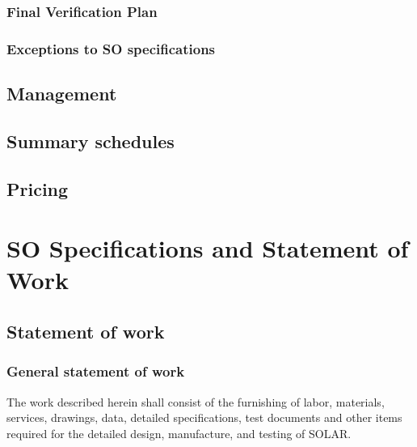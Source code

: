 \documentclass[12pt,letter]{article}
\begin{document}
    \subsubsection{Final Verification Plan}
    \subsubsection{Exceptions to SO specifications}
\subsection{Management}
\subsection{Summary schedules}
\subsection{Pricing}

\section{SO Specifications and Statement of Work}
\subsection{Statement of work}
	\subsubsection{General statement of work}
    The work described herein shall consist of the furnishing of labor, materials, services, drawings, data, detailed specifications, test documents and other items required for the detailed design, manufacture, and testing of SOLAR.
    
\end{document}

